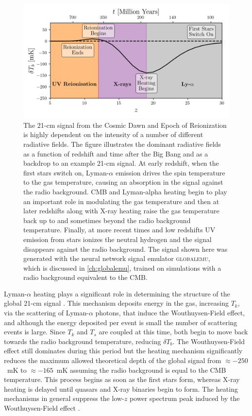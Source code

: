 \begin{figure}
    \centering
    \includegraphics{introduction/figs/signal.png}
    \caption{The 21-cm signal from the Cosmic Dawn and Epoch of Reionization is highly dependent on the intensity of a number of different radiative fields. The figure illustrates the dominant radiative fields as a function of redshift and time after the Big Bang and as a backdrop to an example 21-cm signal. At early redshift, when the first stars switch on, Lyman-$\alpha$ emission drives the spin temperature to the gas temperature, causing an absorption in the signal against the radio background. CMB and Lyman-alpha heating begin to play an important role in modulating the gas temperature and then at later redshifts along with X-ray heating raise the gas temperature back up to and sometimes beyond the radio background temperature. Finally, at more recent times and low redshifts UV emission from stars ionizes the neutral hydrogen and the signal disappears against the radio background. The signal shown here was generated with the neural network signal emulator \textsc{globalemu}, which is discussed in \cref{ch:globalemu}, trained on simulations with a radio background equivalent to the CMB.}
    \label{fig:sky_averaged_signal}
\end{figure}

Lyman-$\alpha$ heating plays a significant role in determining the structure of the global 21-cm signal \cite{Reis_sta_2021}. This mechanism deposits energy in the gas, increasing $T_k$, via the scattering of Lyman-$\alpha$ photons, that induce the Wouthuysen-Field effect, and although the energy deposited per event is small the number of scattering events is large. Since $T_k$ and $T_s$ are coupled at this time, both begin to move back towards the radio background temperature, reducing $\delta T_b$. The Wouthuysen-Field effect still dominates during this period but the heating mechanism significantly reduces the maximum allowed theoretical depth of the global signal from $\approx - 250$~mK to $\approx - 165$~mK \cite{Reis_sta_2021} assuming the radio background is equal to the CMB temperature. This process begins as soon as the first stars form, whereas X-ray heating is delayed until quasars and X-ray binaries begin to form. The heating mechanisms in general suppress the low-$z$ power spectrum peak induced by the Wouthuysen-Field effect \cite{Chuzhoy2007, Villanueva2020, Venumadhav2018, Reis_sta_2021, Mittal2021}.

